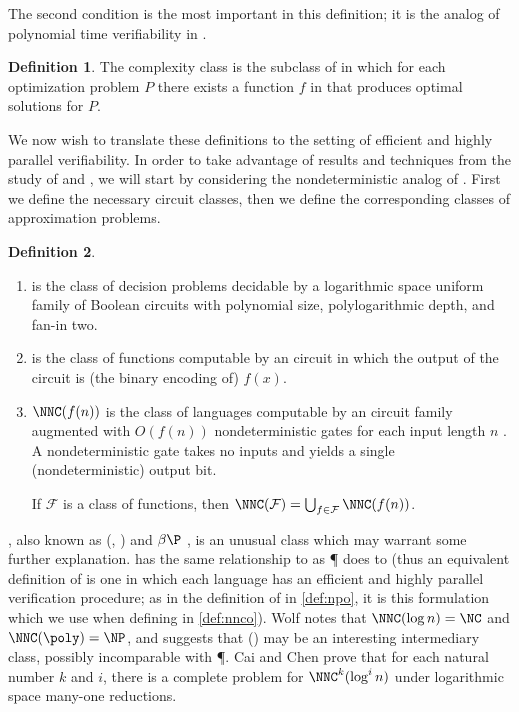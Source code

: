 \documentclass[]{article}
\theoremstyle{plain}
\theoremstyle{definition}
\newtheorem{definition}{Definition}
\begin{document}
The second condition is the most important in this definition; it is the analog of polynomial time verifiability in \NP.

\begin{definition}
  The complexity class \PO{} is the subclass of \NPO{} in which for each optimization problem $P$ there exists a function $f$ in \FP{} that produces optimal solutions for $P$.
\end{definition}

We now wish to translate these definitions to the setting of efficient and highly parallel verifiability.
In order to take advantage of results and techniques from the study of \NPO{} and \PO, we will start by considering the nondeterministic analog of \PO.
First we define the necessary circuit classes, then we define the corresponding classes of approximation problems.

\begin{definition}
  \mbox{}
  \begin{enumerate}
  \item \NC{} is the class of decision problems decidable by a logarithmic space uniform family of Boolean circuits with polynomial size, polylogarithmic depth, and fan-in two.
  \item \FNC{} is the class of functions computable by an \NC{} circuit in which the output of the circuit is (the binary encoding of) $f(x)$.
  \item $\NNC(f(n))$ is the class of languages computable by an \NC{} circuit family augmented with $O(f(n))$ nondeterministic gates for each input length $n$ \cite{wolf94}.
    A nondeterministic gate takes no inputs and yields a single (nondeterministic) output bit.

    If $\mathcal{F}$ is a class of functions, then $\NNC(\mathcal{F})=\bigcup_{f\in\mathcal{F}}{\NNC(f(n))}$.
  \end{enumerate}
\end{definition}

\NNCpoly, also known as \GC(\poly, \NC) \cite{cc97} and $\beta\P$ \cite{kf80}, is an unusual class which may warrant some further explanation.
\NC{} has the same relationship to \NNCpoly{} as \P{} does to \NP{} (thus an equivalent definition of \NNCpoly{} is one in which each language has an efficient and highly parallel verification procedure; as in the definition of \NPO{} in \autoref{def:npo}, it is this formulation which we use when defining \NNCO{} in \autoref{def:nnco}).
Wolf \cite{wolf94} notes that $\NNC(\log n)=\NC$ and $\NNC(\poly)=\NP$, and suggests that \NNC(\polylog) may be an interesting intermediary class, possibly incomparable with \P.
Cai and Chen \cite{cc97} prove that for each natural number $k$ and $i$, there is a complete problem for $\NNC^k(\log^i n)$ under logarithmic space many-one reductions.
\end{document}
